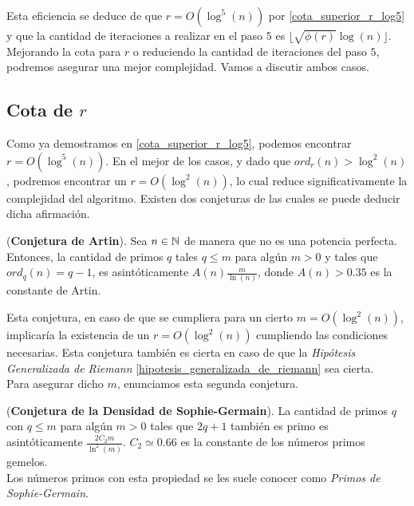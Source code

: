 Esta eficiencia se deduce de que $r = O(\log^5(n))$ por \autoref{cota_superior_r_log5} y que la cantidad de iteraciones a realizar en el paso $5$ es $\lfloor \sqrt{\phi(r)}\log(n) \rfloor$.\\

Mejorando la cota para $r$ o reduciendo la cantidad de iteraciones del paso $5$, podremos asegurar una mejor complejidad. Vamos a discutir ambos casos.

\subsection{Cota de $r$}

Como ya demostramos en \autoref{cota_superior_r_log5}, podemos encontrar $r = O(\log^5(n))$. En el mejor de los casos, y dado que $ord_r(n) > \log^2(n)$, podremos encontrar un $r = O(\log^2(n))$, lo cual reduce significativamente la complejidad del algoritmo. Existen dos conjeturas de las cuales se puede deducir dicha afirmación.

\begin{conjetura}{(\textbf{Conjetura de Artin}).}\label{conjetura_de_artin}
	Sea $n \in \mathbb{N}$ de manera que no es una potencia perfecta. Entonces, la cantidad de primos $q$ tales $q \leq m$ para algún $m > 0$ y tales que $ord_q(n) = q-1$, es asintóticamente $A(n)\frac{m}{\ln(n)}$, donde $A(n) > 0.35$ es la constante de Artin.
\end{conjetura}

Esta conjetura, en caso de que se cumpliera para un cierto $m = O(\log^2(n))$, implicaría la existencia de un $r = O(\log^2(n))$ cumpliendo las condiciones necesarias. Esta conjetura también es cierta en caso de que la \textit{Hipótesis Generalizada de Riemann} \ref{hipotesis_generalizada_de_riemann} sea cierta.\\

Para asegurar dicho $m$, enunciamos esta segunda conjetura.

\begin{conjetura}{(\textbf{Conjetura de la Densidad de Sophie-Germain}).}\label{conjetura_de_sophie_germain}
	La cantidad de primos $q$ con $q \leq m$ para algún $m > 0$ tales que $2q + 1$ también es primo es asintóticamente $\frac{2C_2m}{\ln^2(m)}$. $C_2 \simeq 0.66$ es la constante de los números primos gemelos.\\
	
	Los números primos con esta propiedad se les suele conocer como \textit{Primos de Sophie-Germain}.
\end{conjetura}

